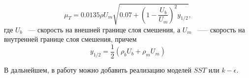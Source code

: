 \begin{equation}
    \mu_{T}=0.0135\rho U_m \sqrt{0.07 + \left(1 - \frac{U_b}{U_m}\right)^2y_{1/2}},
\end{equation}
где $U_b$ ~---  скорость на внешней границе слоя смешения, а $U_m$ ~--— скорость на внутренней границе слоя смешения, причем
\begin{equation}
    y_{1/2} = \frac{1}{2}(\rho_bU_b + \rho_mU_m)
\end{equation}

В дальнейшем, в работу можно добавить реализацию моделей $SST$ или $k-\epsilon$.
